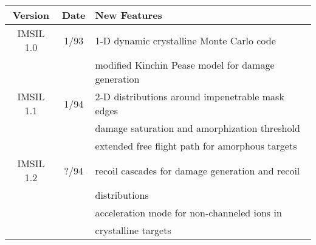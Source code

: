 \begin{center}
\begin{tabular}{|c|c|l|}
\hline
Version   & Date & New Features                \\
\hline\hline
IMSIL 1.0 & 1/93 & 1-D dynamic crystalline Monte Carlo code \\
          &      & modified Kinchin Pease model for damage generation \\
\hline
IMSIL 1.1 & 1/94 & 2-D distributions around impenetrable mask edges \\
          &      & damage saturation and amorphization threshold \\
          &      & extended free flight path for amorphous targets \\
\hline
IMSIL 1.2 & ?/94 & recoil cascades for damage generation and recoil \\
          &      & \quad distributions \\
          &      & acceleration mode for non-channeled ions in \\
          &      & \quad crystalline targets \\
\hline
\end{tabular}
\end{center}
